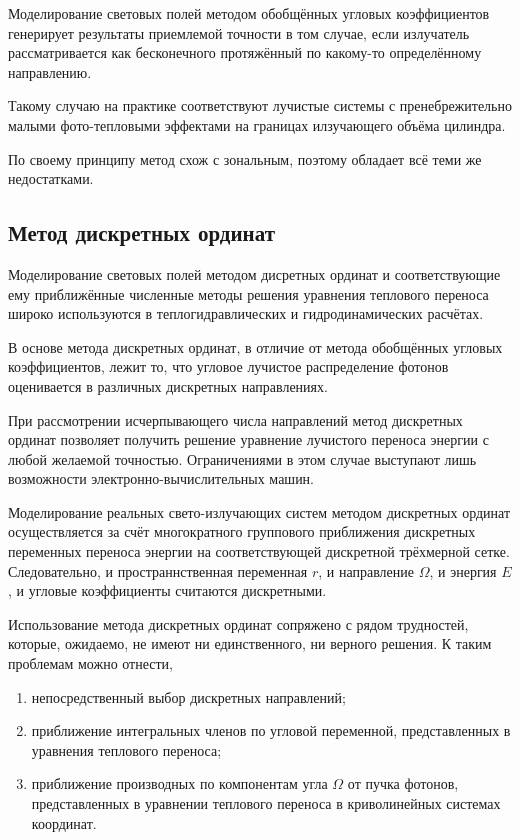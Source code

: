 \begin{FixLineStretch}
\begin{table}[h]
\begin{tabular}{|p{\wA}|p{\wB}|p{\wC}|}
		\end{tabular}
	\end{table}
\end{FixLineStretch}
\let\wC\relax
\let\wB\relax
\let\wA\relax

Моделирование световых полей методом обобщённых угловых коэффициентов генерирует результаты приемлемой точности в том случае, если излучатель рассматривается как бесконечного протяжённый по какому-то определённому направлению.

Такому случаю на практике соответствуют лучистые системы с пренебрежительно малыми фото-тепловыми эффектами на границах илзучающего объёма цилиндра.

По своему принципу метод схож с зональным, поэтому обладает всё теми же недостатками.

\subsection{Метод дискретных ординат}

Моделирование световых полей методом дисретных ординат и соответствующие ему приближённые численные методы решения уравнения теплового переноса широко используются в теплогидравлических и гидродинамических расчётах.

В основе метода дискретных ординат, в отличие от метода обобщённых угловых коэффициентов, лежит то, что угловое лучистое распределение фотонов оценивается в различных дискретных направлениях.

При рассмотрении исчерпывающего числа направлений метод дискретных ординат позволяет получить решение уравнение лучистого переноса энергии с любой желаемой точностью.
Ограничениями в этом случае выступают лишь возможности электронно-вычислительных машин.

Моделирование реальных свето-излучающих систем методом дискретных ординат осуществляется за счёт многократного группового приближения дискретных переменных переноса энергии на соответствующей дискретной трёхмерной сетке.
Следовательно, и пространнственная переменная $r$, и направление $\Omega$, и энергия $E$, и угловые коэффициенты считаются дискретными.

Использование метода дискретных ординат сопряжено с рядом трудностей, которые, ожидаемо, не имеют ни единственного, ни верного решения. К таким проблемам можно отнести,
\begin{enumerate}
	\item непосредственный выбор дискретных направлений;
	\item приближение интегральных членов по угловой переменной, представленных в уравнения теплового переноса;
	\item приближение производных по компонентам угла $\Omega$ от пучка фотонов, представленных в уравнении теплового переноса в криволинейных системах координат.
\end{enumerate}

